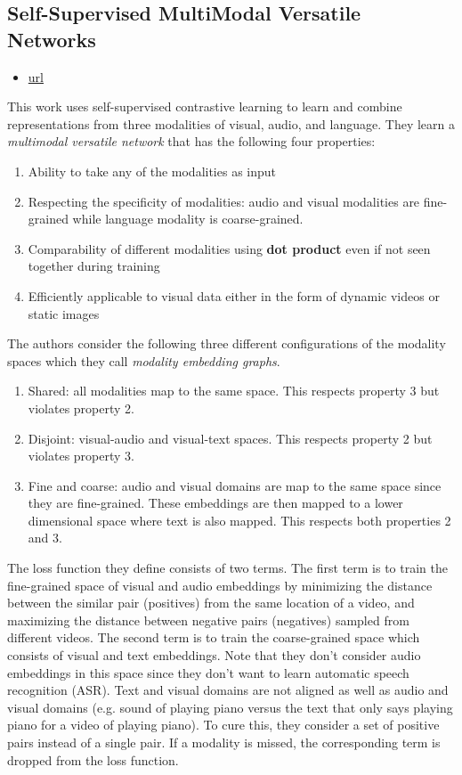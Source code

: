 \documentclass[11pt]{article}
\begin{document}
\subsection{Self-Supervised MultiModal Versatile Networks}

\begin{itemize}
\item \href{https://proceedings.neurips.cc/paper/2020/file/0060ef47b12160b9198302ebdb144dcf-Paper.pdf?utm\_campaign=NLP\%20News\&utm\_medium=email\&utm\_source=Revue\%20newsletter}{url}
\end{itemize}


This work uses self-supervised contrastive learning to learn and combine representations from three modalities of visual, audio, and language. They learn a \textit{multimodal versatile network} that has the following four properties:
\begin{enumerate}
\item Ability to take any of the modalities as input
\item Respecting the specificity of modalities: audio and visual modalities are fine-grained while language modality is coarse-grained.
\item Comparability of different modalities using \textbf{dot product} even if not seen together during training 
\item Efficiently applicable to visual data either in the form of dynamic videos or static images
\end{enumerate}


The authors consider the following three different configurations of the modality spaces which they call \textit{modality embedding graphs}.
\begin{enumerate}
\item Shared: all modalities map to the same space. This respects property 3 but violates property 2.
\item Disjoint: visual-audio and visual-text spaces. This respects property 2 but violates property 3.
\item Fine and coarse: audio and visual domains are map to the same space since they are fine-grained. These embeddings are then mapped to a lower dimensional space where text is also mapped. This respects both properties 2 and 3.
\end{enumerate}

The loss function they define consists of two terms. The first term is to train the fine-grained space of visual and audio embeddings by minimizing the distance between the similar pair (positives) from the same location of a video, and maximizing the distance between negative pairs (negatives) sampled from different videos. The second term is to train the coarse-grained space which consists of visual and text embeddings. Note that they don't consider audio embeddings in this space since they don't want to learn automatic speech recognition (ASR). Text and visual domains are not aligned as well as audio and visual domains (e.g. sound of playing piano versus the text that only says playing piano for a video of playing piano). To cure this, they consider a set of positive pairs instead of a single pair.
If a modality is missed, the corresponding term is dropped from the loss function.
\end{document}
